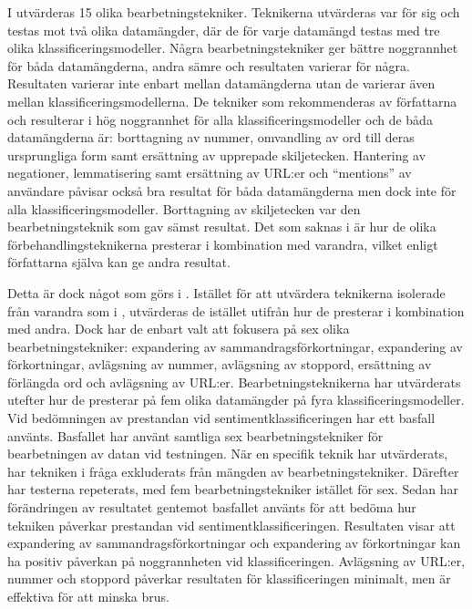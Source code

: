 \documentclass{kaumasters} %
\begin{document}
I \cite{effrosynidis2017comparison} utvärderas 15 olika bearbetningstekniker. Teknikerna utvärderas var för sig och testas mot två olika datamängder, där de för varje datamängd testas med tre olika klassificeringsmodeller. Några bearbetningstekniker ger bättre noggrannhet för båda datamängderna, andra sämre och resultaten varierar för några. Resultaten varierar inte enbart mellan datamängderna utan de varierar även mellan klassificeringsmodellerna. De tekniker som rekommenderas av författarna och resulterar i hög noggrannhet för alla klassificeringsmodeller och de båda datamängderna är: borttagning av nummer, omvandling av ord till deras ursprungliga form samt ersättning av upprepade skiljetecken. Hantering av negationer, lemmatisering samt ersättning av URL:er och “mentions” av användare påvisar också bra resultat för båda datamängderna men dock inte för alla klassificeringsmodeller. Borttagning av skiljetecken var den bearbetningsteknik som gav sämst resultat. Det som saknas i \cite{effrosynidis2017comparison} är hur de olika förbehandlingsteknikerna presterar i kombination med varandra, vilket enligt författarna själva kan ge andra resultat.

Detta är dock något som görs i \cite{7862202}. Istället för att utvärdera teknikerna isolerade från varandra som i \cite{effrosynidis2017comparison}, utvärderas de istället utifrån hur de presterar i kombination med andra. Dock har de enbart valt att fokusera på sex olika bearbetningstekniker: expandering av sammandragsförkortningar, expandering av förkortningar, avlägsning av nummer, avlägsning av stoppord, ersättning av förlängda ord och avlägsning av URL:er. Bearbetningsteknikerna har utvärderats utefter hur de presterar på fem olika datamängder på fyra klassificeringsmodeller. Vid bedömningen av prestandan vid sentimentklassificeringen har ett basfall använts. Basfallet har använt samtliga sex bearbetningstekniker för bearbetningen av datan vid testningen. När en specifik teknik har utvärderats, har tekniken i fråga exkluderats från mängden av bearbetningstekniker. Därefter har testerna repeterats, med fem bearbetningstekniker istället för sex. Sedan har förändringen av resultatet gentemot basfallet använts för att bedöma hur tekniken påverkar prestandan vid sentimentklassificeringen. Resultaten visar att expandering av sammandragsförkortningar och expandering av förkortningar kan ha positiv påverkan på noggrannheten vid klassificeringen. Avlägsning av URL:er, nummer och stoppord påverkar resultaten för klassificeringen minimalt, men är effektiva för att minska brus. 
\end{document}
